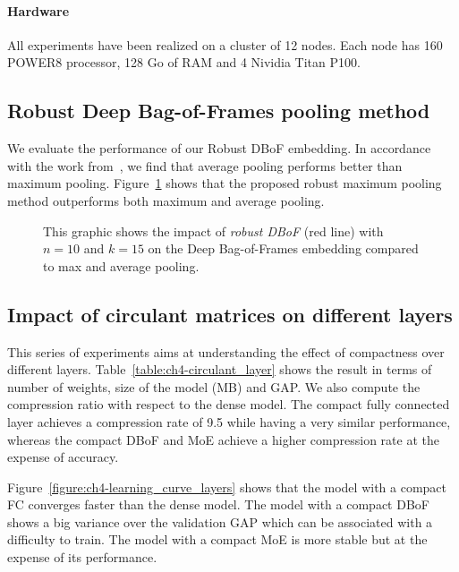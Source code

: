\paragraph{Hardware}
All experiments have been realized on a cluster of 12 nodes. Each node has 160 POWER8 processor, 128 Go of RAM and 4 Nividia Titan P100.


\subsection{Robust Deep Bag-of-Frames pooling method}
\label{subsection:ch4-exp_bagging}

We evaluate the performance of our Robust DBoF embedding.
In accordance with the work from~\cite{abu2016youtube}, we find that average pooling performs better than maximum pooling. 
Figure~\ref{figure:ch4-learning_curve_bagging} shows that the proposed robust maximum pooling method outperforms both maximum and average pooling.

\begin{figure}[htb]
  \centering
  
  \caption{This graphic shows the impact of \emph{robust DBoF} (\ie red line) with $n=10$ and $k=15$ on the Deep Bag-of-Frames embedding compared to max and average pooling.}
  \label{figure:ch4-learning_curve_bagging}
\end{figure}

\subsection{Impact of circulant matrices on different layers}

This series of experiments aims at understanding the effect of compactness over different layers.
Table~\ref{table:ch4-circulant_layer} shows the result in terms of number of weights, size of the model (MB) and GAP.
We also compute the compression ratio with respect to the dense model.
The compact fully connected layer achieves a compression rate of 9.5 while having a very similar performance, whereas the compact DBoF and MoE achieve a higher compression rate at the expense of accuracy. 

Figure~\ref{figure:ch4-learning_curve_layers} shows that the model with a compact FC converges faster than the dense model.
The model with a compact DBoF shows a big variance over the validation GAP which can be associated with a difficulty to train.
The model with a compact MoE is more stable but at the expense of its performance.

